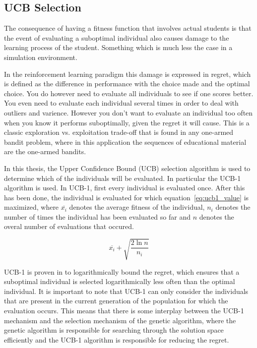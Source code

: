 \subsection{UCB Selection}
\label{sec:approach_ucb}
The consequence of having a fitness function that involves actual
students is that the event of evaluating a suboptimal individual
also causes damage to the learning process of the student. Something
which is much less the case in a simulation environment.

In the reinforcement learning paradigm this damage is expressed in regret, which
is defined as the difference in performance with the choice made and the
optimal choice. You do however need to evaluate all individuals to see if one
scores better. You even need to evaluate each individual several times in order
to deal with outliers and varience. However you don't want to evaluate an
individual too often when you know it performs suboptimally, given the regret
it will cause. This is a classic exploration vs. exploitation trade-off that is
found in any one-armed bandit problem, where in this application the sequences
of educational material are the one-armed bandits.

In this thesis, the Upper Confidence Bound (UCB) selection algorithm is used to
determine which of the individuals will be evaluated. In
particular the UCB-1 \citep{Auer2002} algorithm is used. In UCB-1,
first every individual is evaluated once. After this has been done, the
individual is evaluated for which equation~\eqref{eq:ucb1_value} is maximized,
where $\overline{x_i}$ denotes the average fitness of the individual, $n_i$
denotes the number of times the individual has been evaluated so far and $n$
denotes the overal number of evaluations that occured.

\begin{equation}
	\overline{x_i} + \sqrt{\frac{2 \ln n}{n_i}}
	\label{eq:ucb1_value}
\end{equation}

UCB-1 is proven in \citep{Auer2002} to logarithmically bound the
regret, which ensures that a suboptimal individual is selected logarithmically
less often than the optimal individual. It is important to note that UCB-1 can
only consider the individuals that are present in the current generation of the
population for which the evaluation occurs. This means that there is some
interplay between the UCB-1 mechanism and the selection mechanism of the
genetic algorithm, where the genetic algorithm is responsible for searching
through the solution space efficiently and the UCB-1 algorithm is responsible
for reducing the regret.

